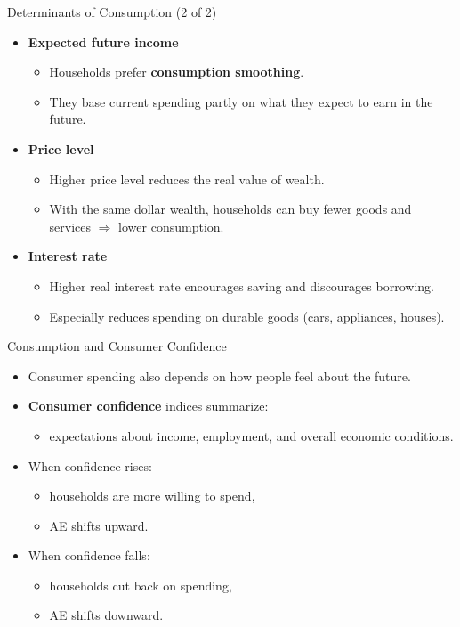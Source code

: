 \documentclass[aspectratio=169]{beamer}
\begin{document}
\begin{frame}{Determinants of Consumption (2 of 2)}
\transfade
\begin{itemize}
  \item \textbf{Expected future income}
  \begin{itemize}
    \item Households prefer \textbf{consumption smoothing}.
    \item They base current spending partly on what they expect to earn in the future.
  \end{itemize}
  \item \textbf{Price level}
  \begin{itemize}
    \item Higher price level reduces the real value of wealth.
    \item With the same dollar wealth, households can buy fewer goods and services \(\Rightarrow\) lower consumption.
  \end{itemize}
  \item \textbf{Interest rate}
  \begin{itemize}
    \item Higher real interest rate encourages saving and discourages borrowing.
    \item Especially reduces spending on durable goods (cars, appliances, houses).
  \end{itemize}
\end{itemize}
\end{frame}

\begin{frame}{Consumption and Consumer Confidence}
\transfade
\begin{itemize}
  \item Consumer spending also depends on how people feel about the future.
  \item \textbf{Consumer confidence} indices summarize:
  \begin{itemize}
    \item expectations about income, employment, and overall economic conditions.
  \end{itemize}
  \item When confidence rises:
  \begin{itemize}
    \item households are more willing to spend,
    \item AE shifts upward.
  \end{itemize}
  \item When confidence falls:
  \begin{itemize}
    \item households cut back on spending,
    \item AE shifts downward.
  \end{itemize}
\end{itemize}
\end{frame}
\end{document}
